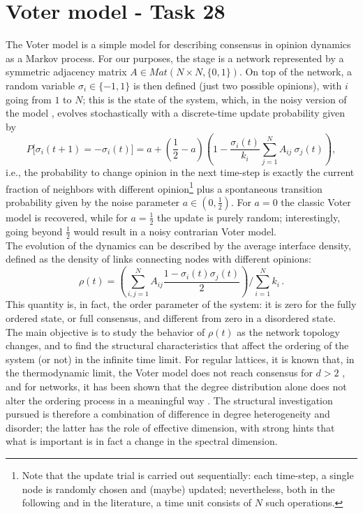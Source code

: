 \chapter{Voter model - Task 28}
The Voter model is a simple model for describing consensus in opinion dynamics as a Markov process.
For our purposes, the stage is a network represented by a symmetric adjacency matrix $A \in Mat(N \times N,\{0,1\})$. On top of the network, a random variable $\sigma_i \in \{-1,1\}$ is then defined (just two possible opinions), with $i$ going from $1$ to $N$; this is the state of the system, which, in the noisy version of the model \cite{carro2016noisy}, evolves stochastically with a discrete-time update probability given by
\begin{equation}
\label{updateprob}
P\bigl[\sigma_i(t+1) = -\sigma_i(t)\bigr]
=a + \left( \frac{1}{2}-a\right) 
\left(
  1 - \frac{\sigma_i(t)}{k_i}
  \sum_{j=1}^N  A_{ij}\  \sigma_j(t)
\right),
\end{equation}
i.e., the probability to change opinion in the next time-step is exactly the current fraction of neighbors with different opinion\footnote{Note that the update trial is carried out sequentially: each time-step, a single node is randomly chosen and (maybe) updated; nevertheless, both in the following and in the literature, a time unit consists of $N$ such operations.} plus a spontaneous transition probability given by the noise parameter $a \in (0,\frac{1}{2})$. For $a=0$ the classic Voter model is recovered, while for $a = \frac{1}{2}$ the update is purely random; interestingly, going beyond $\frac{1}{2}$ would result in a noisy contrarian Voter model.\\
The evolution of the dynamics can be described by the average interface density, defined as the density of links connecting nodes with different opinions:
\begin{equation}
\rho(t)
= \left(\sum_{i,j=1}^N A_{ij} \frac{1 - \sigma_i(t) \sigma_j(t)}{2}\right)
\Big/
\sum_{i=1}^N k_i\,.
\end{equation}
This quantity is, in fact, the order parameter of the system: it is zero for the fully ordered state, or full consensus, and different from zero in a disordered state.\\

The main objective is to study the behavior of $\rho(t)$ as the network topology changes, and to find the structural characteristics that affect the ordering of the system (or not) in the infinite time limit.
For regular lattices, it is known that, in the thermodynamic limit, the Voter model does not reach consensus for $d>2$ \cite{alhammal2005langevin}, and for networks, it has been shown that the degree distribution alone does not alter the ordering process in a meaningful way \cite{suchecki2005voter}.
The structural investigation pursued is therefore a combination of difference in degree heterogeneity and disorder; the latter has the role of effective dimension, with strong hints that what is important is in fact a change in the spectral dimension.

